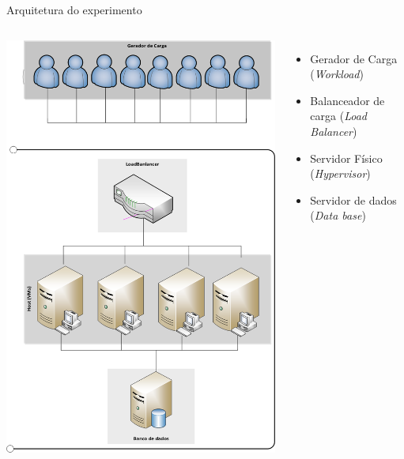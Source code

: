 \begin{frame}{Arquitetura do experimento}
	\begin{columns}
		\begin{minipage}[c][0.4\textheight][c]{\linewidth}
			\centering
			\includegraphics[scale=0.17]{../monograph/images/arquitetura-experimento.png}
			\label{fig:arquitetura-experimento}		
		\end{minipage}
		\begin{minipage}[c][0.4\textheight][c]{\linewidth}
			\begin{itemize}
				\item Gerador de Carga (\textit{Workload})
				\item Balanceador de carga (\textit{Load Balancer})
				\item Servidor Físico (\textit{Hypervisor})
				\item Servidor de dados (\textit{Data base})
			\end{itemize}
		\end{minipage}		
	\end{columns}
	
\end{frame}

